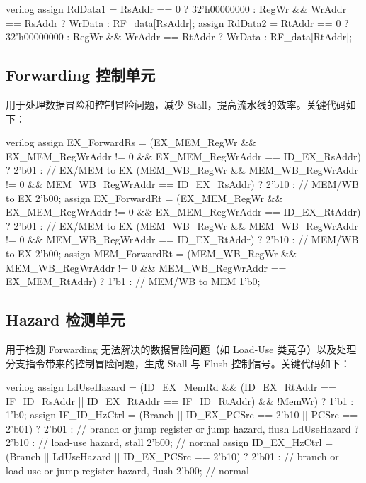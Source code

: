 \documentclass[a4paper]{article}  %
\begin{document}
\begin{codeblock}{verilog}
assign RdData1 = RsAddr == 0 ? 32'h00000000 :
                 RegWr && WrAddr == RsAddr ? WrData :
                 RF_data[RsAddr];
assign RdData2 = RtAddr == 0 ? 32'h00000000 :
                 RegWr && WrAddr == RtAddr ? WrData :
                 RF_data[RtAddr];
\end{codeblock}

\subsection{Forwarding 控制单元}

用于处理数据冒险和控制冒险问题，减少 Stall，提高流水线的效率。关键代码如下：

\begin{codeblock}{verilog}
assign EX_ForwardRs = 
                (EX_MEM_RegWr && EX_MEM_RegWrAddr != 0 && EX_MEM_RegWrAddr == ID_EX_RsAddr) ? 2'b01 :  // EX/MEM to EX
                (MEM_WB_RegWr && MEM_WB_RegWrAddr != 0 && MEM_WB_RegWrAddr == ID_EX_RsAddr) ? 2'b10 :  // MEM/WB to EX
                2'b00;
assign EX_ForwardRt = 
                (EX_MEM_RegWr && EX_MEM_RegWrAddr != 0 && EX_MEM_RegWrAddr == ID_EX_RtAddr) ? 2'b01 :  // EX/MEM to EX
                (MEM_WB_RegWr && MEM_WB_RegWrAddr != 0 && MEM_WB_RegWrAddr == ID_EX_RtAddr) ? 2'b10 :  // MEM/WB to EX
                2'b00;
assign MEM_ForwardRt = 
                (MEM_WB_RegWr && MEM_WB_RegWrAddr != 0 && MEM_WB_RegWrAddr == EX_MEM_RtAddr) ? 1'b1 :  // MEM/WB to MEM
                1'b0;
\end{codeblock}

\subsection{Hazard 检测单元}

用于检测 Forwarding 无法解决的数据冒险问题（如 Load-Use 类竞争）以及处理分支指令带来的控制冒险问题，生成 Stall 与 Flush 控制信号。关键代码如下：

\begin{codeblock}{verilog}
assign LdUseHazard = 
                (ID_EX_MemRd && (ID_EX_RtAddr == IF_ID_RsAddr || ID_EX_RtAddr == IF_ID_RtAddr) && !MemWr) ? 1'b1 :
                1'b0;
assign IF_ID_HzCtrl = 
                (Branch || ID_EX_PCSrc == 2'b10 || PCSrc == 2'b01) ? 2'b01 :  // branch or jump register or jump hazard, flush
                LdUseHazard ? 2'b10 :  // load-use hazard, stall
                2'b00;  // normal
assign ID_EX_HzCtrl = 
                (Branch || LdUseHazard || ID_EX_PCSrc == 2'b10) ? 2'b01 :  // branch or load-use or jump register hazard, flush
                2'b00;  // normal
\end{codeblock}
\end{document}
